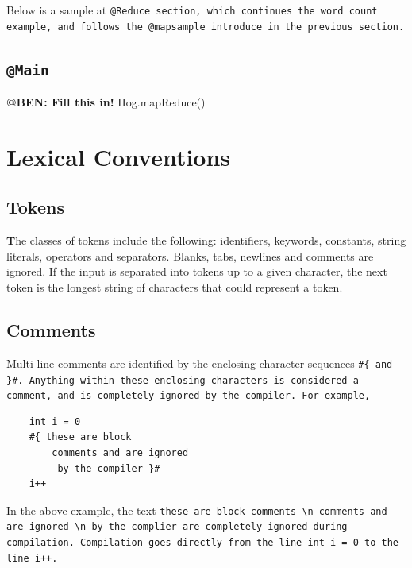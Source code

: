 \documentclass{article}
\begin{document}
Below is a sample at \tt @Reduce \rm section, which continues the word count
example, and follows the @mapsample introduce in the previous section.


\subsection{\tt @Main \rm} %
\label{sec:tt_main_rm}

\textbf{@BEN: Fill this in!} Hog.mapReduce()



\section{Lexical Conventions} %
\label{sec:lexical_conventions}

\subsection{Tokens} %
\label{sub:tokens}

\textbf The classes of tokens include the following: identifiers, keywords, constants, string literals, operators and separators. Blanks, tabs, newlines and comments are ignored. If the input is separated into tokens up to a given character, the next token is the longest string of characters that could represent a token.


\subsection{Comments} %
\label{sub:comments}

Multi-line comments are identified by the enclosing character sequences \tt \#\{ \rm and \tt \}\#\rm. Anything within these
enclosing characters is considered a comment, and is completely ignored by the compiler. For example,

\begin{verbatim}
    int i = 0
    #{ these are block
        comments and are ignored
         by the compiler }#
    i++
\end{verbatim}

In the above example, the text \tt these are block comments \textbackslash n comments and are ignored \textbackslash n by the
complier \rm are completely ignored during compilation. Compilation goes directly from the line \tt int i = 0 \rm to the line
\tt i++\rm.
\end{document}
